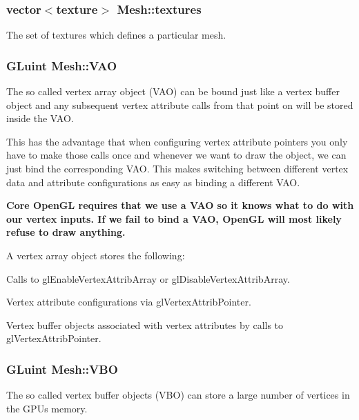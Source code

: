 \subsubsection[{\texorpdfstring{textures}{textures}}]{\setlength{\rightskip}{0pt plus 5cm}vector$<${\bf texture}$>$ Mesh\+::textures}\hypertarget{classMesh_aa154a7fb2e174902c1d2ebf0755261a0}{}\label{classMesh_aa154a7fb2e174902c1d2ebf0755261a0}
The set of textures which defines a particular mesh. 
\subsubsection[{\texorpdfstring{V\+AO}{VAO}}]{\setlength{\rightskip}{0pt plus 5cm}G\+Luint Mesh\+::\+V\+AO\hspace{0.3cm}{\ttfamily [private]}}\hypertarget{classMesh_a09b989b9d4df8ae595d7e80e091a4a5b}{}\label{classMesh_a09b989b9d4df8ae595d7e80e091a4a5b}
The so called vertex array object (V\+AO) can be bound just like a vertex buffer object and any subsequent vertex attribute calls from that point on will be stored inside the V\+AO.

This has the advantage that when configuring vertex attribute pointers you only have to make those calls once and whenever we want to draw the object, we can just bind the corresponding V\+AO. This makes switching between different vertex data and attribute configurations as easy as binding a different V\+AO.

{\bfseries Core Open\+GL requires that we use a V\+AO so it knows what to do with our vertex inputs. If we fail to bind a V\+AO, Open\+GL will most likely refuse to draw anything.}

A vertex array object stores the following\+:


\begin{DoxyItemize}
\item Calls to gl\+Enable\+Vertex\+Attrib\+Array or gl\+Disable\+Vertex\+Attrib\+Array.
\item Vertex attribute configurations via gl\+Vertex\+Attrib\+Pointer.
\item Vertex buffer objects associated with vertex attributes by calls to gl\+Vertex\+Attrib\+Pointer. 
\end{DoxyItemize}
\subsubsection[{\texorpdfstring{V\+BO}{VBO}}]{\setlength{\rightskip}{0pt plus 5cm}G\+Luint Mesh\+::\+V\+BO\hspace{0.3cm}{\ttfamily [private]}}\hypertarget{classMesh_a0d28b2c6fee628a13f43cae3f858569b}{}\label{classMesh_a0d28b2c6fee628a13f43cae3f858569b}
The so called vertex buffer objects (V\+BO) can store a large number of vertices in the G\+PU\textquotesingle{}s memory.

